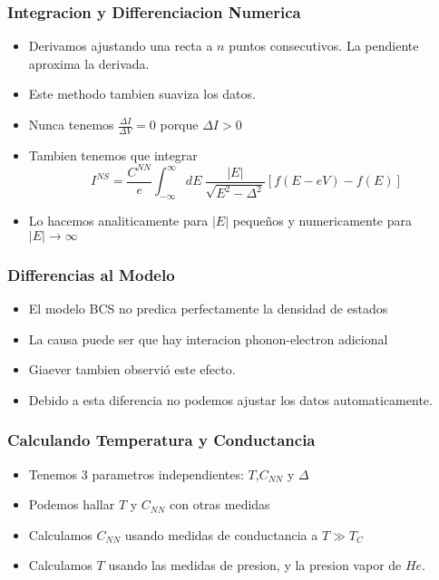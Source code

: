 



\frame
{
  \frametitle{Integracion y Differenciacion Numerica}
   
   \begin{itemize}
     \item<1-> Derivamos ajustando una recta a $n$ puntos consecutivos. La pendiente aproxima la derivada.
     \item<2-> Este methodo tambien suaviza los datos.
     \item<3-> Nunca tenemos $\frac{\Delta I}{\Delta V}=0$ porque $\Delta I>0$
     \item<4-> Tambien tenemos que integrar
     \begin{equation*}\label{ins}
		I^{NS} = \frac{C^{NN}}{e} \int_{-\infty}^{\infty} dE\ \frac{|E|}{\sqrt{E^2-\Delta^2}} [f(E-eV)-f(E)]
	\end{equation*}
     \item<5-> Lo hacemos analiticamente para $|E|$ peque\~nos y numericamente para $|E|\to\infty$
   \end{itemize}
  
}



\frame
{
  \frametitle{Differencias al Modelo}
  
  \begin{itemize}
  \item<1-> El modelo BCS no predica perfectamente la densidad de estados
  \item<2-> La causa puede ser que hay interacion phonon-electron adicional
  \item<3-> Giaever tambien observi\'o este efecto.
  \item<4-> Debido a esta diferencia no podemos ajustar los datos automaticamente.
  \end{itemize}
  
  
}



\frame
{
  \frametitle{Calculando Temperatura y Conductancia}
  
    \begin{itemize}
     \item<1-> Tenemos 3 parametros independientes: $T$,$C_{NN}$ y $\Delta$ 
     \item<2-> Podemos hallar $T$ y $C_{NN}$ con otras medidas
     \item<3-> Calculamos $C_{NN}$ usando medidas de conductancia a $T\gg T_C$
     \item<4-> Calculamos $T$ usando las medidas de presion, y la presion vapor de $He$.
  \end{itemize}}

